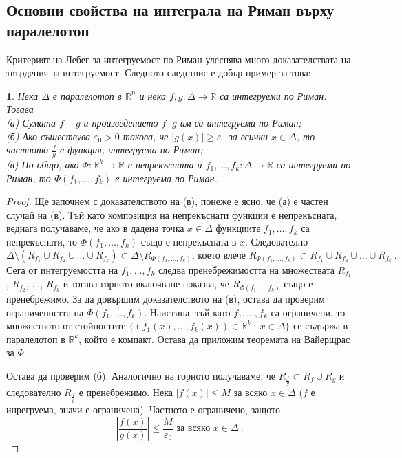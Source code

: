 \documentclass[11pt]{article}
\numberwithin{equation}{section}
\numberwithin{figure}{section}
\numberwithin{table}{section}
\theoremstyle{plain}
\theoremstyle{definition}
\theoremstyle{remark}
\theoremstyle{definition}
\theoremstyle{remark}
\theoremstyle{plain}
\theoremstyle{definition}
\theoremstyle{definition}
\theoremstyle{plain}
\newtheorem{cor}[thm]{\protect\corollaryname}
\theoremstyle{plain}
\theoremstyle{plain}
\theoremstyle{definition}
\theoremstyle{plain}
\providecommand{\corollaryname}{Следствие}
\newcommand*{\R}{\mathbb{R}}
\begin{document}
\subsection{Основни свойства на интеграла на Риман върху паралелотоп}

Критерият на Лебег за интегруемост по Риман улеснява много доказателствата на твърдения за интегруемост. Следното следствие е добър пример за това:

\begin{cor}
Нека $\Delta$ е паралелотоп в $\R^n$ и нека $f, g: \Delta \longrightarrow \R$ са интегруеми по Риман. Тогава
\\
(а) Сумата $f+g$ и произведението $f\cdot g$ им са интегруеми по Риман;
\\
(б) Ако съществува $\varepsilon_0 >0$ такова, че $|g(x)|\geq \varepsilon_0$ за всички $x \in \Delta$, то частното $\frac{f}{g}$ е функция, интегруема по Риман;
\\
(в) По-общо, ако $\Phi :\R^k \longrightarrow \R$  е непрекъсната и $f_1, \dots , f_k:\Delta \longrightarrow \R$ са интегруеми по Риман, то $\Phi (f_1,\dots ,f_k)$ е интегруема по Риман.
\end{cor}

\begin{proof}
Ще започнем с доказателството на (в), понеже е ясно, че (а) е частен случай на (в). Тъй като композиция на непрекъснати функции е непрекъсната, веднага получаваме, че ако в дадена точка $x\in \Delta$ функциите $f_1, \dots , f_k$ са непрекъснати, то $\Phi (f_1,\dots ,f_k)$ също е непрекъсната в $x$. Следователно
$$\Delta\setminus \left( R_{f_1}\cup R_{f_2}\cup \dots \cup R_{f_k}\right)\subset \Delta\setminus R_{\Phi (f_1,\dots ,f_k)} \mbox{, което влече } R_{\Phi (f_1,\dots ,f_k)}\subset R_{f_1}\cup R_{f_2}\cup \dots \cup R_{f_k} \ .$$
Сега от интегруемостта на $f_1, \dots , f_k$ следва пренебрежимостта на множествата $R_{f_1}$, $R_{f_2}$, $\dots$, $R_{f_k}$ и тогава горното включване показва, че $R_{\Phi (f_1,\dots ,f_k)}$ също е пренебрежимо. За да довършим доказателството на (в), остава да проверим ограничеността на $\Phi (f_1,\dots ,f_k)$. Наистина, тъй като $f_1, \dots , f_k$ са ограничени, то множеството от стойностите
$\{ (f_1(x), \dots , f_k(x))\in \R^k \ : \ x\in \Delta\}$ се съдържа в паралелотоп в $\R^k$, който е компакт. Остава да приложим теоремата на Вайерщрас за $\Phi$.

Остава да проверим (б). Аналогично на горното получаваме, че $R_{\frac{f}{g}}\subset R_{f}\cup R_{g}$ и следователно $R_{\frac{f}{g}}$ е пренебрежимо. Нека $|f(x)|\le M$ за всяко $x\in \Delta$ ($f$ е инрегруема, значи е ограничена). Частното е ограничено, защото
$$\left| \frac{f(x)}{g(x)}\right| \le \frac{M}{\varepsilon_0} \mbox{ за всяко } x\in \Delta \ .$$ 
\end{proof}
\end{document}
